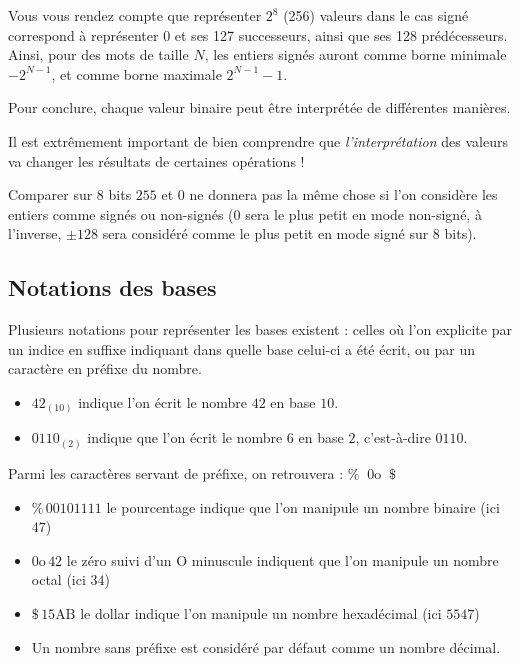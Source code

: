 \documentclass[11pt,a4paper]{article}
\begin{document}
\bigskip

Vous vous rendez compte que représenter $ 2^8 $ (256) valeurs dans le cas signé correspond à représenter $ 0 $ et ses 127 successeurs, ainsi que ses 128 prédécesseurs.
Ainsi, pour des mots de taille $ N $, les entiers signés auront comme borne minimale $ - 2^{N-1} $, et comme borne maximale $ 2^{N-1} - 1 $.

Pour conclure, chaque valeur binaire peut être interprétée de différentes manières.

Il est extrêmement important de bien comprendre que \textit{l'interprétation} des valeurs va changer les résultats de certaines opérations !

Comparer sur 8 bits $ 255 $ et $ 0 $ ne donnera pas la même chose si l'on considère les entiers comme signés ou non-signés ($ 0 $ sera le plus petit en mode non-signé, à l'inverse, $ \pm 128 $ sera considéré comme le plus petit en mode signé sur 8 bits).

\medskip


\subsection{Notations des bases}

\medskip

Plusieurs notations pour représenter les bases existent : celles où l'on explicite par un indice en suffixe indiquant dans quelle base celui-ci a été écrit, ou par un caractère en préfixe du nombre.

\begin{itemize}
\item $ 42_{(10)} $ indique l'on écrit le nombre \og $ 42 $ \fg{} en base $ 10 $.
\item $ 0110_{(2)} $ indique que l'on écrit le nombre \og $ 6 $ \fg{} en base $ 2 $, c'est-à-dire $ 0110 $.
\end{itemize}

\medskip

Parmi les caractères servant de préfixe, on retrouvera : $ \%   \; \;  0\text{o}  \; \;  \$  $

\begin{itemize}
\item \og $ \% \, 00101111 $ \fg{} le pourcentage indique que l'on manipule un nombre binaire (ici $ 47 $)
\item \og $ 0\text{o} \, 42 $ \fg{} le zéro suivi d'un O minuscule indiquent que l'on manipule un nombre octal (ici $ 34 $)
\item \og $ \$ \, 15\text{AB} $ \fg{} le dollar indique l'on manipule un nombre hexadécimal (ici $ 5547 $)
\item Un nombre sans préfixe est considéré par défaut comme un nombre décimal.
\end{itemize}
\end{document}
